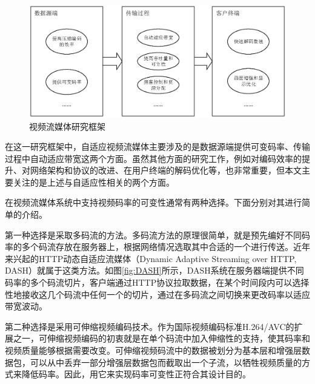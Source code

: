 \begin{figure}[t]
	\centering
	\vspace{10pt}
	\includegraphics[width = 1.0\linewidth]{eps/research-framework}
	\caption{视频流媒体研究框架 \label{fig:research-framework}}
\end{figure}

\vspace{10pt}
在这一研究框架中，自适应视频流媒体主要涉及的是数据源端提供可变码率、传输过程中自动适应带宽这两个方面。虽然其他方面的研究工作，例如对编码效率的提升、对网络架构和协议的改进、在用户终端的解码优化等，也非常重要，但本文主要关注的是上述与自适应性相关的两个方面。

在视频流媒体系统中支持视频码率的可变性通常有两种选择。下面分别对其进行简单的介绍。

第一种选择是采取多码流的方法。多码流方法的原理很简单，就是预先编好不同码率的多个码流存放在服务器上，根据网络情况选取其中合适的一个进行传送。近年来兴起的HTTP动态自适应流媒体（Dynamic Adaptive Streaming over HTTP,  DASH）\supercite{Sodagar2011}就属于这类方法。如图\ref{fig:DASH}所示，DASH系统在服务器端提供不同码率的多个码流切片，客户端通过HTTP协议拉取数据，在某个时间段内可以选择性地接收这几个码流中任何一个的切片，通过在多码流之间切换来更改码率以适应带宽波动。

第二种选择是采用可伸缩视频编码\supercite{SVC-Overview}技术。作为国际视频编码标准H.264/AVC\supercite{H.264}的扩展之一，可伸缩视频编码的初衷就是在单个码流中加入伸缩性的支持，使其码率和视频质量能够根据需要改变。可伸缩视频码流中的数据被划分为基本层和增强层数据包，可以从中丢弃一部分增强层数据包而截取出一个子流，以牺牲视频质量的方式来降低码率。因此，用它来实现码率可变性正符合其设计目的。

